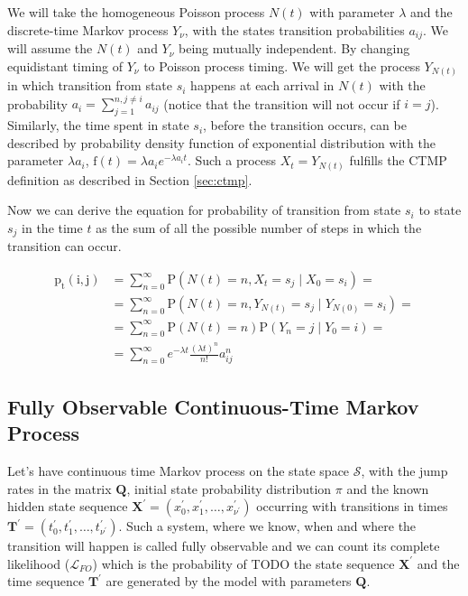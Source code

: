 \documentclass[thesis=M,english]{FITthesis}[2012/10/20]
\newcommand{\matr}[1]{\mathbf{#1}}
\begin{document}
We will take the homogeneous Poisson process $N(t)$ with parameter $\lambda$ and the discrete-time Markov process $Y_{\nu}$, with the states transition probabilities $a_{ij}$. We will assume the $N(t)$ and $Y_{\nu}$ being mutually independent. By changing equidistant timing of $Y_{\nu}$ to Poisson process timing. We will get the process $Y_{N(t)}$ in which transition from state $s_i$ happens at each arrival in $N(t)$ with the probability $a_i = \sum_{j = 1}^{ n ,j \neq i} a_{ij}$ (notice that the transition will not occur if $i=j$). Similarly, the time spent in state $s_i$, before the transition occurs, can be described by probability density function of exponential distribution with the parameter $\lambda a_i$, $\mathrm{f}(t)= \lambda a_i e^{- \lambda a_i t}$. Such a process $X_t = Y_{N(t)}$ fulfills the CTMP definition as described in Section \ref{sec:ctmp}.


Now we can derive the equation for probability of transition from state $s_i$ to state $s_j$ in the time $t$ as the sum of all the possible number of steps in which the transition can occur. 

\begin{equation}
\begin{aligned}
\mathrm{p_t(i,j)} &= \sum_{n=0}^{\infty} \mathrm{P}( N(t) = n, X_t = s_j \mid X_0 = s_i )  = \\
                  &= \sum_{n=0}^{\infty} \mathrm{P}( N(t) = n, Y_{N(t)} = s_j \mid Y_{N(0)} = s_i )  = \\
                  &= \sum_{n=0}^{\infty} \mathrm{P}( N(t) = n ) \mathrm{P}( Y_n = j \mid Y_0 = i )  = \\
				  &= \sum_{n=0}^{\infty} e^{-\lambda t} \frac{ (\lambda t)^n}{n!} a_{ij}^n  
\end{aligned}
\end{equation} 





\subsection{ Fully Observable Continuous-Time Markov Process }

Let's have continuous time Markov process on the state space $\mathcal{S}$, with the jump rates in the matrix $\matr{Q}$, initial state probability distribution $\pi$ and the known hidden state sequence $\matr{X^{'}}= ( x_0^{'}, x_1^{'}, \dots, x_{\nu^{'}}^{'} ) $ occurring with transitions in times $\matr{T^{'}} = ( t_0^{'}, t_1^{'}, \dots, t_{\nu^{'}}^{'} )$. Such a system, where we know, when and where the transition will happen is called fully observable and we can count its complete likelihood ($\mathcal{L}_{FO}$) which is the probability of TODO the state sequence $\matr{X^{'}}$ and the time sequence $\matr{T^{'}}$ are generated by the model with parameters $\matr{Q}$. 
\end{document}
